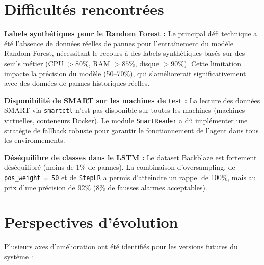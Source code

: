 \section*{Difficultés rencontrées}

\textbf{Labels synthétiques pour le Random Forest :} Le principal défi technique a été
l'absence de données réelles de pannes pour l'entraînement du modèle Random Forest,
nécessitant le recours à des labels synthétiques basés sur des seuils métier (CPU $> 80\%$,
RAM $> 85\%$, disque $> 90\%$). Cette limitation impacte la précision du modèle (50--70\%),
qui s'améliorerait significativement avec des données de pannes historiques réelles.

\textbf{Disponibilité de SMART sur les machines de test :} La lecture des données SMART
via \texttt{smartctl} n'est pas disponible sur toutes les machines (machines virtuelles,
conteneurs Docker). Le module \texttt{SmartReader} a dû implémenter une stratégie de
fallback robuste pour garantir le fonctionnement de l'agent dans tous les environnements.

\textbf{Déséquilibre de classes dans le LSTM :} Le dataset Backblaze est fortement
déséquilibré (moins de 1\% de pannes). La combinaison d'oversampling, de
\texttt{pos\_weight = 50} et de \texttt{StepLR} a permis d'atteindre un rappel de 100\%,
mais au prix d'une précision de 92\% (8\% de fausses alarmes acceptables).

\section*{Perspectives d'évolution}

Plusieurs axes d'amélioration ont été identifiés pour les versions futures du système :

